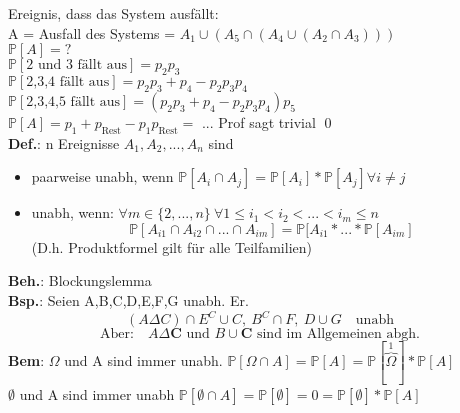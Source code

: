Ereignis, dass das System ausfällt:\\
A = Ausfall des Systems = $A_1 \cup (A_5\cap (A_4 \cup (A_2 \cap A_3)))$\smallskip\\
$\mathds{P}[A] = ?$\\
$\mathds{P}[\text{2 und 3 fällt aus}] = p_2p_3$\smallskip\\
$\mathds{P}[\text{2,3,4 fällt aus}] = p_2p_3+p_4 -p_2p_3p_4$\smallskip\\
$\mathds{P}[\text{2,3,4,5 fällt aus}] = (p_2p_3+p_4-p_2p_3p_4)p_5$\smallskip\\
$\mathds{P}[A] = p_1 + p_\text{Rest} - p_1p_\text{Rest} =$ ... Prof sagt trivial \qed\medskip\\
\textbf{Def.}: n Ereignisse $A_1, A_2,...,A_n$ sind
\begin{itemize}
	\item paarweise unabh, wenn $\mathds{P}[A_i \cap A_j] = \mathds{P}[A_i] * \mathds{P}[A_j] \forall i \neq j$
	\item unabh, wenn: $\forall m \in \{2,...,n\} \: \forall 1 \leq i_1 < i_2 <...<i_m\leq n$
	$$\mathds{P}[A_{i1}\cap A_{i2}\cap ... \cap A_{im}] = \mathds{P}[A_{i1}* ... * \mathds{P}[A_{im}]$$
	(D.h. Produktformel gilt für alle Teilfamilien)
\end{itemize} 
\textbf{Beh.}: Blockungslemma\\
\textbf{Bsp.}: Seien A,B,C,D,E,F,G unabh. Er.
$$(A \Delta C) \cap E^C \cup C, \: B^C\cap F,\: D\cup G \quad \text{unabh}$$ 
$$\text{Aber:} \quad A \Delta \mathbf{C} \text{ und } B \cup \mathbf{C} \text{ sind im Allgemeinen abgh.}$$
\textbf{Bem}: $\Omega$ und A sind immer unabh. \hspace{1cm} $\mathds{P}[\Omega \cap A] = \mathds{P}[A]=\mathds{P}[\overbrace{\Omega}^1]*\mathds{P}[A]$\\
$\emptyset$ und A sind immer unabh \hspace{1cm} $\mathds{P}[\emptyset \cap A] = \mathds{P}[\emptyset]=0=\mathds{P}[\emptyset]*\mathds{P}[A]$
